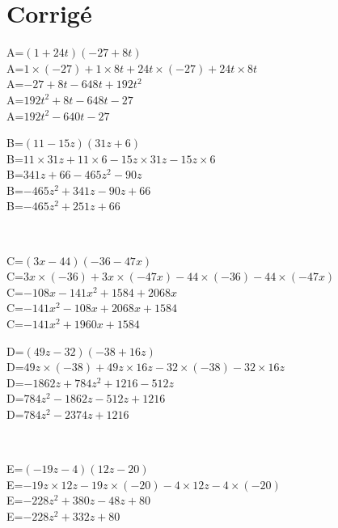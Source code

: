 \documentclass{article}%
\begin{document}
%
\newpage%
\section{Corrigé}%
\label{sec:Corrig}%
\begin{minipage}{0.5\textwidth}%
A=$(1+24t)(-27+8t)$\\%
A=$1 \times (-27)+1 \times 8t+24t \times (-27)+24t \times 8t$\\%
A=$-27+8t-648t+192t^2$\\%
A=$192t^2+8t-648t-27$\\%
A=$192t^2-640t-27$\\%
\end{minipage}%
\begin{minipage}{0.5\textwidth}%
B=$(11-15z)(31z+6)$\\%
B=$11 \times 31z+11 \times 6-15z \times 31z-15z \times 6$\\%
B=$341z+66-465z^2-90z$\\%
B=$-465z^2+341z-90z+66$\\%
B=$-465z^2+251z+66$\\%
\end{minipage}%
\\%
\begin{minipage}{0.5\textwidth}%
C=$(3x-44)(-36-47x)$\\%
C=$3x \times (-36)+3x \times (-47x)-44 \times (-36)-44 \times (-47x)$\\%
C=$-108x-141x^2+1584+2068x$\\%
C=$-141x^2-108x+2068x+1584$\\%
C=$-141x^2+1960x+1584$\\%
\end{minipage}%
\begin{minipage}{0.5\textwidth}%
D=$(49z-32)(-38+16z)$\\%
D=$49z \times (-38)+49z \times 16z-32 \times (-38)-32 \times 16z$\\%
D=$-1862z+784z^2+1216-512z$\\%
D=$784z^2-1862z-512z+1216$\\%
D=$784z^2-2374z+1216$\\%
\end{minipage}%
\\%
\begin{minipage}{0.5\textwidth}%
E=$(-19z-4)(12z-20)$\\%
E=$-19z \times 12z-19z \times (-20)-4 \times 12z-4 \times (-20)$\\%
E=$-228z^2+380z-48z+80$\\%
E=$-228z^2+332z+80$\\%
\end{minipage}%
\end{document}
